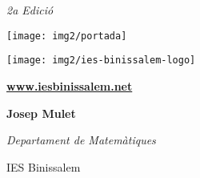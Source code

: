  
 \vspace*{0.5cm}
 

 \begin{center}
 	
 	\shadowoffset{2pt}
 	
	 \begin{blueshaded}
	 	\begin{center} 
	 	\vspace{0.5cm}
	 			
		{\fontsize{38}{57}\selectfont 
			\textbf{} 
		}
		 
		\vspace{1cm}
		\shadowoffset{1pt}
		{\huge \textbf{}}
	
		\vspace{1cm}
	
	{\Large \normalfont\textit{2a Edició}	}	
		\vspace{0.5cm}
\end{center}

\end{blueshaded}
 

 \vspace{1cm}
 
 \texttt{[image: img2/portada]}

\vspace{1.5cm}

 
\begin{minipage}{0.4\textwidth}
\begin{center}
	\texttt{[image: img2/ies-binissalem-logo]}
 
	\small
	
	\noindent \href{www.iesbinissalem.net}{\textbf{www.iesbinissalem.net}}  
 
\end{center}
\end{minipage}
\begin{minipage}{0.4\textwidth}
\begin{flushright}
\textbf{Josep Mulet}

\textit{Departament de Matemàtiques} 

 IES Binissalem
\end{flushright}
\end{minipage} 


\end{center}

\newpage

